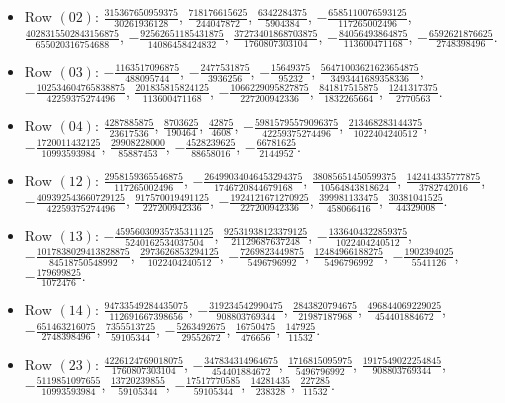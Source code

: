 \documentclass[11pt]{article}
\begin{document}
\begin{itemize}
\item Row $(02)$: $\frac{315367650959375}{30261936128}$, $\frac{718176615625}{244047872}$, $\frac{6342284375}{5904384}$, $-\frac{6585110076593125}{117265002496}$, $\frac{4028315502843156875}{655020316754688}$, $-\frac{92562651185431875}{14086458424832}$, $\frac{37273401868703875}{1760807303104}$, $-\frac{84056493864875}{113600471168}$, $-\frac{6592621876625}{2748398496}$.
\item Row $(03)$: $-\frac{1163517096875}{488095744}$, $-\frac{2477531875}{3936256}$, $-\frac{15649375}{95232}$, $\frac{56471003621623654875}{3493441689358336}$, $-\frac{102534604765838875}{42259375274496}$, $\frac{201835815824125}{113600471168}$, $-\frac{1066229095827875}{227200942336}$, $\frac{841817515875}{1832265664}$, $\frac{1241317375}{2770563}$.
\item Row $(04)$: $\frac{4287885875}{23617536}$, $\frac{8703625}{190464}$, $\frac{42875}{4608}$, $-\frac{59815795579096375}{42259375274496}$, $\frac{213468283144375}{1022404240512}$, $-\frac{1720011432125}{10993593984}$, $\frac{29908228000}{85887453}$, $-\frac{4528239625}{88658016}$, $-\frac{66781625}{2144952}$.
\item Row $(12)$: $\frac{2958159365546875}{117265002496}$, $-\frac{26499034046453294375}{1746720844679168}$, $\frac{38085651450599375}{10564843818624}$, $\frac{142414335777875}{3782742016}$, $-\frac{409392543660729125}{42259375274496}$, $\frac{917570019491125}{227200942336}$, $-\frac{1924121671270925}{227200942336}$, $\frac{399981133475}{458066416}$, $\frac{30381041525}{44329008}$.
\item Row $(13)$: $-\frac{45956030935735311125}{5240162534037504}$, $\frac{92531938123379125}{21129687637248}$, $-\frac{1336404322859375}{1022404240512}$, $-\frac{1017838029413828875}{84518750548992}$, $\frac{2973626853294125}{1022404240512}$, $-\frac{7269823449875}{5496796992}$, $\frac{12484966188275}{5496796992}$, $-\frac{1902394025}{5541126}$, $-\frac{179699825}{1072476}$.
\item Row $(14)$: $\frac{94733549284435075}{112691667398656}$, $-\frac{319234542990475}{908803769344}$, $\frac{2843820794675}{21987187968}$, $\frac{496844069229025}{454401884672}$, $-\frac{651463216075}{2748398496}$, $\frac{7355513725}{59105344}$, $-\frac{5263492675}{29552672}$, $\frac{16750475}{476656}$, $\frac{147925}{11532}$.
\item Row $(23)$: $\frac{4226124769018075}{1760807303104}$, $-\frac{347834314964675}{454401884672}$, $\frac{1716815095975}{5496796992}$, $\frac{1917549022254845}{908803769344}$, $-\frac{5119851097655}{10993593984}$, $\frac{13720239855}{59105344}$, $-\frac{17517770585}{59105344}$, $\frac{14281435}{238328}$, $\frac{227285}{11532}$.

\end{itemize}
\end{document}
